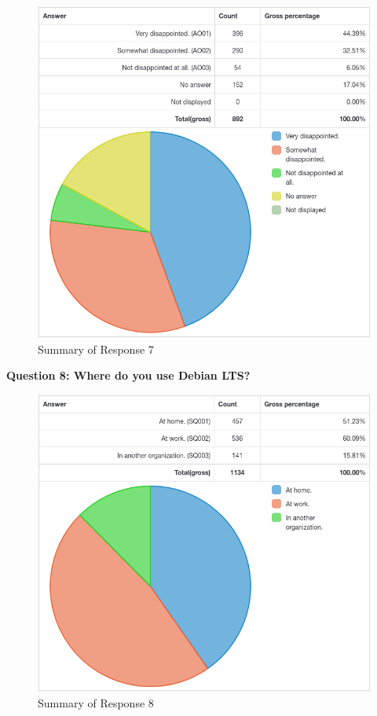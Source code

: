 \documentclass{article}
\begin{document}
\vspace{3mm}
\begin{figure}[h!]
\centering
\includegraphics[width=16.5cm]{assets/7-complete-responses.png}
\caption{Summary of Response 7}
\end{figure}

\newpage

\Large{\textbf{Question 8: Where do you use Debian LTS?}}

\vspace{3mm}
\begin{figure}[h!]
\centering
\includegraphics[width=16.5cm]{assets/8-complete-responses.png}
\caption{Summary of Response 8}
\end{figure}
\end{document}
